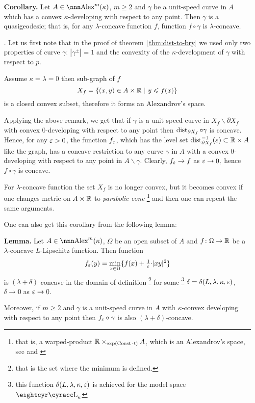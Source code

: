 \documentclass{article}
\begin{document}
\begin{thm}{\bf Corollary.} \label{cor:eq-qg}
Let $A\in\Alex^m(\kappa)$, $m\ge2$ and $\gamma$ be a unit-speed curve in $A$
which has a convex $\kappa$-developing with respect to any point.
Then $\gamma$ is a quasigeodesic;
that is, for any $\lambda$-concave function $f$,
function $f\circ\gamma$ is $\lambda$-concave.
\end{thm}

\Proof.  Let us first note that in the proof of theorem~\ref{thm:dist-to-bry} we
used only two properties of curve $\gamma$:
$|\gamma^\pm|=1$ and the convexity of the $\kappa$-development of $\gamma$ with respect
to $p$.

Assume $\kappa=\lambda=0$ then sub-graph of $f$
$$X_f=\{(x,y)\in A\times\mathbb{R}\ |\ y\leqslant f(x)\}$$ 
is a closed convex subset, therefore it forms an Alexandrov's space.

Applying the above remark, we get that if $\gamma$ is a unit-speed curve in
$X_f\backslash \partial X_f$ with convex $0$-developing with respect to any
point then $\operatorname{dist}_{\partial X_f}\circ\gamma$ is concave.
 Hence, for any $\varepsilon>0$, the function $f_\varepsilon$, which has the level set $\operatorname{dist}_{\partial X_f}^{-1}(\varepsilon)\subset \mathbb{R}\times A$ like the graph, has a concave restriction to any curve $\gamma$ in
$A$ with a convex $0$-developing with respect to any
point in $A\backslash\gamma$. 
Clearly, $f_\varepsilon\to f$ as $\varepsilon\to 0$, hence $f\circ\gamma$ is concave. 

For $\lambda$-concave function the set $X_f$ is no longer convex, but it becomes convex if one changes metric on $A\times\mathbb{R}$ to \emph{parabolic cone}%
\footnote{\label{par-cone} that is, a warped-product
$\mathbb{R}\times_{\exp(\operatorname{Const}{\cdot}t)} A$, which is an Alexandrov's space, see \cite[4.3.3]{BGP} and \cite{alexander-bishop:worps}} 
and then one can repeat the same arguments.\qeds


 One can also get this corollary from the following lemma:

\begin{thm}{\bf Lemma.}\label{f_eps}
Let $A\in\Alex^m(\kappa)$, $\Omega$ be an open subset of $A$ and
 $f\colon\Omega\to\mathbb{R}$ be a $\lambda$-concave $L$-Lipschitz function.
Then function
$$f_\varepsilon(y)=\min_{x\in\Omega}\{f(x)+\tfrac1{\varepsilon}{\cdot}|x y|^2\}$$
is $(\lambda+\delta)$-concave in the domain of definition%
\footnote{that is the set where the minimum is defined.} 
for some%
\footnote{this function $\delta(L,\lambda,\kappa,\varepsilon)$ is achieved for the model space $\Lobm_\kappa$} 
$\delta=\delta(L,\lambda,\kappa,\varepsilon)$, $\delta\to0$ as $\varepsilon\to 0$.

Moreover, if $m\ge 2$ and $\gamma$ is a unit-speed curve in $A$ with $\kappa$-convex developing with respect to any point then 
$f_\varepsilon\circ\gamma$ is also $(\lambda+\delta)$-concave.
\end{thm}
\end{document}
